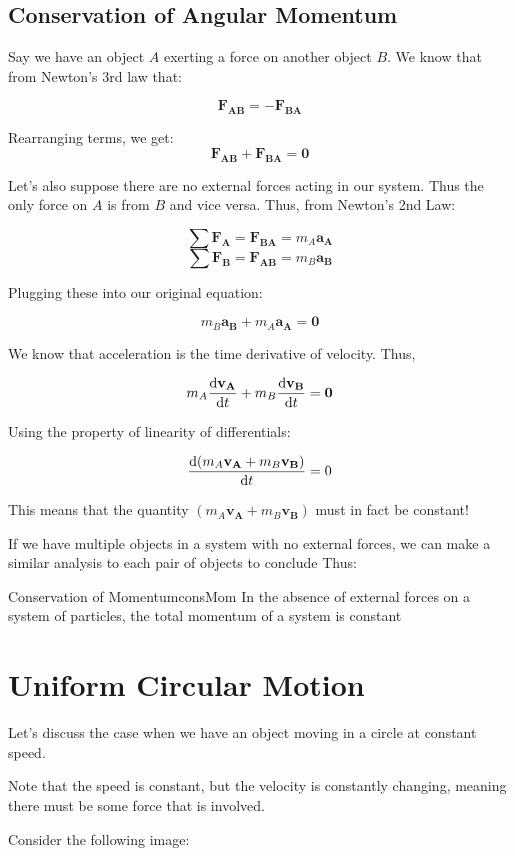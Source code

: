 \documentclass{report}
\begin{document}
\subsection{Conservation of Angular Momentum}
Say we have an object $A$ exerting a force on another object $B$.
We know that from Newton's 3rd law that:

$$\mathbf{F_{AB}} = -\mathbf{F_{BA}}$$

Rearranging terms, we get:
$$\mathbf{F_{AB}} + \mathbf{F_{BA}} = \mathbf{0}$$

Let's also suppose there are no external forces acting in our system. Thus the only force on $A$ is from $B$ and vice versa. Thus, from Newton's 2nd Law:

$$\sum \mathbf{F_A} = \mathbf{F_{BA}} = m_A\mathbf{a_A}$$
$$\sum \mathbf{F_B} = \mathbf{F_{AB}} = m_B\mathbf{a_B}$$

Plugging these into our original equation:

$$m_B\mathbf{a_B} + m_A\mathbf{a_A} = \mathbf{0}$$

We know that acceleration is the time derivative of velocity. Thus,

$$m_A\dv{\mathbf{v_A}}{t} + m_B\dv{\mathbf{v_B}}{t} = \mathbf{0}$$

Using the property of linearity of differentials:

$$\dv{(m_A\mathbf{v_A} + m_B\mathbf{v_B})}{t} = 0$$

This means that the quantity 
$(m_A\mathbf{v_A} + m_B\mathbf{v_B})$ must in fact be constant!

If we have multiple objects in a system with no external forces, we can make a similar analysis to each pair of objects to conclude
Thus:
\begin{mytheo}{Conservation of Momentum}{consMom}
    In the absence of external forces on a system of particles, the total momentum of a system is constant
\end{mytheo}


\section{Uniform Circular Motion}
Let's discuss the case when we have an object moving in a circle at constant speed.

Note that the speed is constant, but the velocity is constantly changing, meaning there must be some force that is involved. 

Consider the following image:
\end{document}
